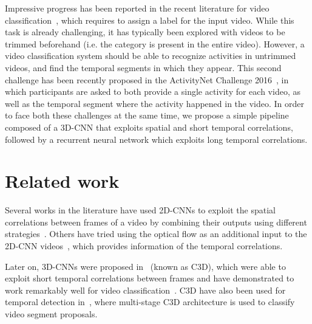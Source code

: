 \documentclass{article}
\begin{document}
Impressive progress has been reported in the recent literature for video classification~\cite{tran2014learning,tran2015deep,wang2015towards,yao2015describing}, which requires to assign a label for the input video. While this task is already challenging, it has typically been explored with videos to be trimmed beforehand (i.e. the category is present in the entire video).
However, a video classification system should be able to recognize activities in untrimmed videos, and find the temporal segments in which they appear.
This second challenge has been recently proposed in the ActivityNet Challenge 2016~\cite{caba2015activitynet}, in which participants are asked to both provide a single activity for each video, as well as the temporal segment where the activity happened in the video.
In order to face both these challenges at the same time, we propose a simple pipeline composed of a 3D-CNN that exploits spatial and short temporal correlations, followed by a recurrent neural network which exploits long temporal correlations.


\section{Related work}


Several works in the literature have used 2D-CNNs to exploit the spatial correlations between frames of a video by combining their outputs using different strategies~\cite{gkioxari2015contextual,yeung2015end,ballas2015delving}. Others have tried using the optical flow as an additional input to the 2D-CNN videos~\cite{wang2015towards}, which provides information of the temporal correlations. %

Later on, 3D-CNNs were proposed in~\cite{tran2014learning} (known as C3D), which were able to exploit short temporal correlations between frames and have demonstrated to work remarkably well for video classification~\cite{tran2014learning,tran2015deep}. C3D have also been used for temporal detection in~\cite{scnn_shou_wang_chang_cvpr16}, where multi-stage C3D architecture is used to classify video segment proposals.
\end{document}
